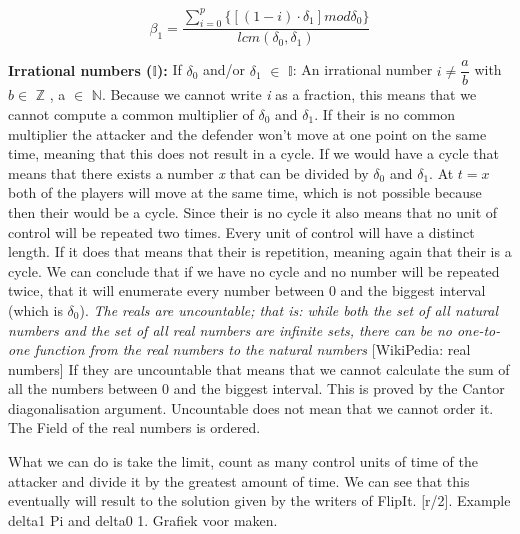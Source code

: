 \begin{equation}\label{first}
\beta_{1} = \dfrac{\sum_{i=0}^{p} \lbrace [( 1 - i ) \cdot \delta_{1}] mod \delta_{0} \rbrace }{lcm(\delta_{0},\delta_{1})} 
\end{equation}

%


\textbf{Irrational numbers (\(\mathbb{I}\)):} If $\delta_{0}$ and/or $\delta_{1}$ $\in$ \(\mathbb{I}\):
An irrational number $ i \neq \dfrac{a}{b}$ with $b \in$ \(\mathbb{Z}\) , a $\in$ \(\mathbb{N}\).
Because we cannot write \textit{i} as a fraction, this means that we cannot compute a common multiplier of $\delta_{0}$ and $\delta_{1}$. If their is no common multiplier the attacker and the defender won't move at one point on the same time, meaning that this does not result in a cycle. If we would have a cycle that means that there exists a number \textit{x} that can be divided by $\delta_{0}$ and $\delta_{1}$. At $t=x$ both of the players will move at the same time, which is not possible because then their would be a cycle. Since their is no cycle it also means that no unit of control will be repeated two times. Every unit of control will have a distinct length. If it does that means that their is repetition, meaning again that their is a cycle.  We can conclude that if we have no cycle and no number will be repeated twice, that it will enumerate every number between 0 and the biggest interval (which is $\delta_{0}$). 
\textit{The reals are uncountable; that is: while both the set of all natural numbers and the set of all real numbers are infinite sets, there can be no one-to-one function from the real numbers to the natural numbers} [WikiPedia: real numbers] If they are uncountable that means that we cannot calculate the sum of all the numbers between 0 and the biggest interval. This is proved by the Cantor diagonalisation argument. Uncountable does not mean that we cannot order it. The Field of the real numbers is ordered. 

What we can do is take the limit, count as many control units of time of the attacker and divide it by the greatest amount of time. We can see that this eventually will result to the solution given by the writers of FlipIt. [r/2]. Example delta1 Pi and delta0 1. Grafiek voor maken.

